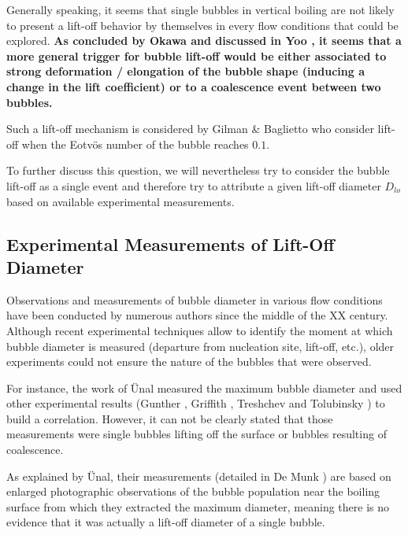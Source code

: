 \npar

Generally speaking, it seems that single bubbles in vertical boiling are not likely to present a lift-off behavior by themselves in every flow conditions that could be explored. \textbf{As concluded by Okawa \etal \cite{okawa_bubble_2005} and discussed in Yoo \etal \cite{yoo_experimental_2016-1}, it seems that a more general trigger for bubble lift-off would be either associated to strong deformation / elongation of the bubble shape (inducing a change in the lift coefficient) or to a coalescence event between two bubbles. }

\begin{note*}{}
Such a lift-off mechanism is considered by Gilman \& Baglietto \cite{gilman_self-consistent_2017} who consider lift-off when the Eotvös number of the bubble reaches $0.1$.
\end{note*}

\npar

To further discuss this question, we will nevertheless try to consider the bubble lift-off as a single event and therefore try to attribute a given lift-off diameter $D_{lo}$ based on available experimental measurements.


\subsection{Experimental Measurements of Lift-Off Diameter}

Observations and measurements of bubble diameter in various flow conditions have been conducted by numerous authors since the middle of the XX century. Although recent experimental techniques allow to identify the moment at which bubble diameter is measured (departure from nucleation site, lift-off, etc.), older experiments could not ensure the nature of the bubbles that were observed. 

\npar

For instance, the work of \"Unal \cite{unal_maximum_1976} measured the maximum bubble diameter and used other experimental results (Gunther \cite{gunther_photographic_1951}, Griffith \cite{griffith_void_1958}, Treshchev \cite{treshchev_number_1969} and Tolubinsky \cite{tolubinsky_vapour_1970}) to build a correlation. However, it can not be clearly stated that those measurements were single bubbles lifting off the surface or bubbles resulting of coalescence. 

\begin{remark*}{}
As explained by \"Unal, their measurements (detailed in De Munk \cite{munk_two-phase_1973}) are based on enlarged photographic observations of the bubble population near the boiling surface from which they extracted the maximum diameter, meaning there is no evidence that it was actually a lift-off diameter of a single bubble.
\end{remark*}




